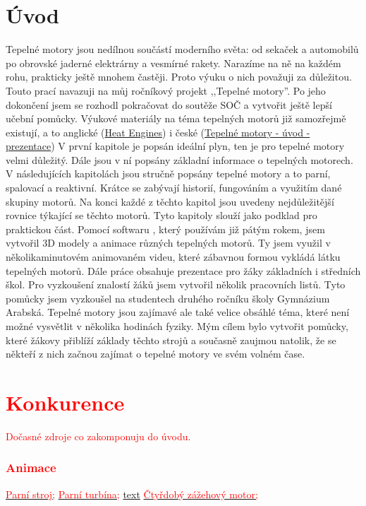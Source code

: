 \section{Úvod}
{Tepelné motory jsou nedílnou součástí moderního světa: od sekaček a automobilů po obrovské jaderné elektrárny a vesmírné rakety. Narazíme na ně na každém rohu, prakticky ještě mnohem častěji. Proto výuku o nich považuji za důležitou. Touto prací navazuji na můj ročníkový projekt ,,Tepelné motory”. Po jeho dokončení jsem se rozhodl pokračovat do soutěže SOČ a vytvořit ještě lepší učební pomůcky.}\odst
{Výukové materiály na téma tepelných motorů již samozřejmě existují, a to anglické (\href{https://www.slideshare.net/slideshow/heat-engine-41517317/41517317}{Heat Engines}) i české (\href{https://zs-nucice.cz/UserFiles/File/eu_new_361-400/VY_32_INOVACE_374.pdf}{Tepelné motory - úvod - prezentace})}\odst
{V první kapitole je popsán ideální plyn, ten je pro tepelné motory velmi důležitý. Dále jsou v ní popsány základní informace o tepelných motorech. V následujících kapitolách jsou stručně popsány tepelné motory a to parní, spalovací a reaktivní. Krátce se zabývají historií, fungováním a využitím dané skupiny motorů. Na konci každé z těchto kapitol jsou uvedeny nejdůležitější rovnice týkající se těchto motorů. Tyto kapitoly slouží jako podklad pro praktickou část.}\odst
{Pomocí softwaru , který používám již pátým rokem, jsem vytvořil 3D modely a ani\-ma\-ce různých tepelných motorů. Ty jsem využil v několikaminutovém animovaném videu, které zábavnou formou vykládá látku tepelných motorů. Dále práce obsahuje prezentace pro žáky základních i středních škol. Pro vyzkoušení znalostí žáků jsem vytvořil několik pracovních listů. Tyto pomůcky jsem vyzkoušel na studentech druhého ročníku školy Gymnázium Arabská.}\odst
{Tepelné motory jsou zajímavé ale také velice obsáhlé téma, které není možné vysvětlit v několika hodinách fyziky. Mým cílem bylo vytvořit pomůcky, které žákovy přiblíží základy těchto strojů a současně zaujmou natolik, že se někteří z nich začnou zajímat o tepelné motory ve svém volném čase.}

\section*{\textcolor{red}{Konkurence}}
\textcolor{red}{Dočasné zdroje co zakomponuju do úvodu.}
\subsubsection*{\textcolor{red}{Animace}}
\href{https://en.wikipedia.org/wiki/Steam_engine#/media/File:Steam_engine_in_action.gif}{\textcolor{red}{Parní stroj;}}
\href{https://www.tlv.com/sites/default/files/tlv_assets/ja/steam_story/images/0611syuruitoyouto/pafs-generator-turbine_EN.gif}{\textcolor{red}{Parní turbína;}}
\href{URL}{text}
\href{https://en.wikipedia.org/wiki/Internal_combustion_engine#/media/File:4StrokeEngine_Ortho_3D_Small.gif}{\textcolor{red}{Čtyřdobý zážehový motor;}}
